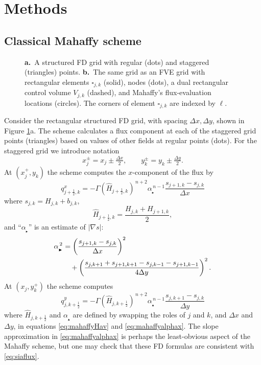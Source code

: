 \documentclass[review,letterpaper]{igs}
\newcommand{\grad}{\nabla}
\newcommand\alpharight{\alpha_{{}_{\blacktriangleright}}}
\newcommand\alphaup{\alpha_{{\!}_{\blacktriangle}}}
\newcommand{\dxtwo}{\tfrac{\Delta x}{2}}
\newcommand{\dytwo}{\tfrac{\Delta y}{2}}
\newcommand{\half}{\tfrac{1}{2}}
\begin{document}
\section{Methods}

\subsection{Classical Mahaffy scheme}

\begin{figure}[ht]
\begin{center}
 \quad 
\end{center}
\caption{\textbf{a.}~A structured FD grid with regular (dots) and staggered (triangles) points.  \textbf{b.}~The same grid as an FVE grid with rectangular elements $\square_{j,k}$ (solid), nodes (dots), a dual rectangular control volume $V_{j,k}$ (dashed), and Mahaffy's flux-evaluation locations (circles).  The corners of element $\square_{j,k}$ are indexed by $\ell$.}
\label{fig:fdfemgrids}
\end{figure}

Consider the rectangular structured FD grid, with spacing $\Delta x,\Delta y$, shown in Figure \ref{fig:fdfemgrids}a.  The \cite{Mahaffy1976} scheme calculates a flux component at each of the staggered grid points (triangles) based on values of other fields at regular points (dots).  For the staggered grid we introduce notation
\begin{equation}
x_j^\pm = x_j \pm \dxtwo, \qquad y_k^\pm = y_k \pm \dytwo. \label{eq:definexypm}
\end{equation}
At $(x_j^+,y_k)$ the scheme computes the $x$-component of the flux by
\begin{equation}
q^x_{j+\half,k} = - \Gamma (\hat H_{j+\half,k})^{\,n+2} \alpharight^{\,n-1} \frac{s_{j+1,k} - s_{j,k}}{\Delta x}  \label{eq:mahaffyqx}
\end{equation}
where $s_{j,k} = H_{j,k} + b_{j,k}$,
\begin{equation}
  \hat H_{j+\half,k} = \frac{H_{j,k} + H_{j+1,k}}{2},  \label{eq:mahaffyHav}
\end{equation}
and ``$\alpharight$\!'' is an estimate of $|\grad s|$:
\begin{align}
\alpharight^{\,2} &= \left(\frac{s_{j+1,k} - s_{j,k}}{\Delta x}\right)^2  \label{eq:mahaffyalphax} \\
  &\quad + \left(\frac{s_{j,k+1} + s_{j+1,k+1} - s_{j,k-1} - s_{j+1,k-1}}{4 \Delta y}\right)^2. \notag
\end{align}
At $(x_j,y_k^+)$ the scheme computes
\begin{equation}
q^y_{j,k+\half} = - \Gamma (\hat H_{j,k+\half})^{\,n+2} \alphaup^{\,n-1} \frac{s_{j,k+1} - s_{j,k}}{\Delta y}  \label{eq:mahaffyqy}
\end{equation}
where $\hat H_{j,k+\half}$ and $\alphaup$ are defined by swapping the roles of $j$ and $k$, and $\Delta x$ and $\Delta y$, in equations \eqref{eq:mahaffyHav} and \eqref{eq:mahaffyalphax}.  The slope approximation in \eqref{eq:mahaffyalphax} is perhaps the least-obvious aspect of the Mahaffy scheme, but one may check that these FD formulas are consistent \citep{MortonMayers2005} with \eqref{eq:siaflux}.
\end{document}
